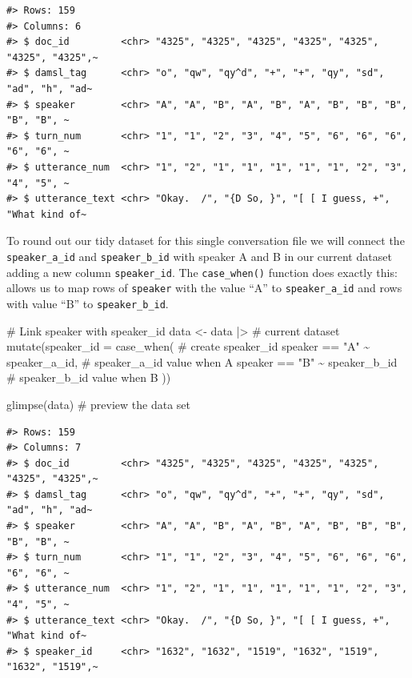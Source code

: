 \documentclass[
  letterpaper,
]{latex/krantz}
\newenvironment{Shaded}{\begin{snugshade}}{\end{snugshade}}
\newcommand{\AttributeTok}[1]{\textcolor[rgb]{0.40,0.45,0.13}{#1}}
\newcommand{\CommentTok}[1]{\textcolor[rgb]{0.37,0.37,0.37}{#1}}
\newcommand{\FunctionTok}[1]{\textcolor[rgb]{0.28,0.35,0.67}{#1}}
\newcommand{\NormalTok}[1]{\textcolor[rgb]{0.00,0.23,0.31}{#1}}
\newcommand{\OtherTok}[1]{\textcolor[rgb]{0.00,0.23,0.31}{#1}}
\newcommand{\SpecialCharTok}[1]{\textcolor[rgb]{0.37,0.37,0.37}{#1}}
\newcommand{\StringTok}[1]{\textcolor[rgb]{0.13,0.47,0.30}{#1}}
\begin{document}
\begin{verbatim}
#> Rows: 159
#> Columns: 6
#> $ doc_id         <chr> "4325", "4325", "4325", "4325", "4325", "4325", "4325",~
#> $ damsl_tag      <chr> "o", "qw", "qy^d", "+", "+", "qy", "sd", "ad", "h", "ad~
#> $ speaker        <chr> "A", "A", "B", "A", "B", "A", "B", "B", "B", "B", "B", ~
#> $ turn_num       <chr> "1", "1", "2", "3", "4", "5", "6", "6", "6", "6", "6", ~
#> $ utterance_num  <chr> "1", "2", "1", "1", "1", "1", "1", "2", "3", "4", "5", ~
#> $ utterance_text <chr> "Okay.  /", "{D So, }", "[ [ I guess, +", "What kind of~
\end{verbatim}

To round out our tidy dataset for this single conversation file we will
connect the \texttt{speaker\_a\_id} and \texttt{speaker\_b\_id} with
speaker A and B in our current dataset adding a new column
\texttt{speaker\_id}. The \texttt{case\_when()} function does exactly
this: allows us to map rows of \texttt{speaker} with the value ``A'' to
\texttt{speaker\_a\_id} and rows with value ``B'' to
\texttt{speaker\_b\_id}.

\begin{Shaded}
\begin{Highlighting}[]
\CommentTok{\# Link speaker with speaker\_id}
\NormalTok{data }\OtherTok{\textless{}{-}} 
\NormalTok{  data }\SpecialCharTok{|\textgreater{}} \CommentTok{\# current dataset}
  \FunctionTok{mutate}\NormalTok{(}\AttributeTok{speaker\_id =} \FunctionTok{case\_when}\NormalTok{( }\CommentTok{\# create speaker\_id}
\NormalTok{    speaker }\SpecialCharTok{==} \StringTok{"A"} \SpecialCharTok{\textasciitilde{}}\NormalTok{ speaker\_a\_id, }\CommentTok{\# speaker\_a\_id value when A}
\NormalTok{    speaker }\SpecialCharTok{==} \StringTok{"B"} \SpecialCharTok{\textasciitilde{}}\NormalTok{ speaker\_b\_id }\CommentTok{\# speaker\_b\_id value when B}
\NormalTok{  ))}

\FunctionTok{glimpse}\NormalTok{(data) }\CommentTok{\# preview the data set}
\end{Highlighting}
\end{Shaded}

\begin{verbatim}
#> Rows: 159
#> Columns: 7
#> $ doc_id         <chr> "4325", "4325", "4325", "4325", "4325", "4325", "4325",~
#> $ damsl_tag      <chr> "o", "qw", "qy^d", "+", "+", "qy", "sd", "ad", "h", "ad~
#> $ speaker        <chr> "A", "A", "B", "A", "B", "A", "B", "B", "B", "B", "B", ~
#> $ turn_num       <chr> "1", "1", "2", "3", "4", "5", "6", "6", "6", "6", "6", ~
#> $ utterance_num  <chr> "1", "2", "1", "1", "1", "1", "1", "2", "3", "4", "5", ~
#> $ utterance_text <chr> "Okay.  /", "{D So, }", "[ [ I guess, +", "What kind of~
#> $ speaker_id     <chr> "1632", "1632", "1519", "1632", "1519", "1632", "1519",~
\end{verbatim}
\end{document}
